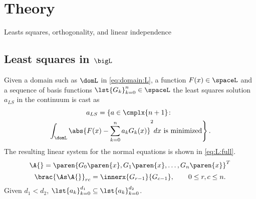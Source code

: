 \section{Theory}

Leasts squares,  orthogonality, and linear independence
 
\subsection{Least squares in $\bigL$}  %
Given a domain such as $\domL$ in \eqref{eq:domain:L}, a function $F(x)\in\spaceL$ and a sequence of basis functions $\lst{G_{k}}_{k=0}^{n}\in\spaceL$ the least squares solution $a_{LS}$ in the continuum is cast as
  \begin{multline}
    a_{LS} = \left\{ a\in\cmplx{n+1} \colon \right. \\
    \left. \int_{\domL}{ \abs{F(x)-\sum_{k=0}^{n}a_{k} G_{k}(x)}^{2} dx } \text{ is minimized}
    \right\}.
    \label{eq:L:lsq}
  \end{multline}
The resulting linear system for the normal equations is shown in \ref{eq:L:full}. 
  \begin{equation}
    \A{} = \paren{G_{0}\paren{x}, G_{1}\paren{x}, \dots, G_{n}\paren{x}}^{T}
  \end{equation}
  \begin{equation}
    \brac{\As \A{}}_{rc} = \innerx{G_{r-1}} {G_{c-1}}, \qquad 0 \le r, c \le n .
  \end{equation}
Given $d_{1}<d_{2}$, $\lst{a_{k}}_{k=0}^{d_{1}} \subseteq \lst{a_{k}}_{k=0}^{d_{2}}$.




